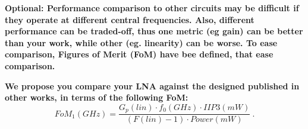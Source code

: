 






\begin{pexbox}{}
   \noindent \textbf{Optional: Performance comparison to other circuits may be difficult if they operate at different central frequencies. Also, different performance can be traded-off, thus one metric (eg gain) can be better than your work, while other (eg. linearity) can be worse. To ease comparison, Figures of Merit (FoM) have bee defined, that ease comparison.}

   \noindent \textbf{We propose you compare your LNA against the designed published in other works, in
   terms of the following FoM:}
   \begin{equation}
      FoM_1 (GHz) = \frac{G_p(lin) \cdot f_0 (GHz) \cdot IIP3 (mW) }{ \left(F(lin) - 1\right) \cdot Power (mW) } \ .
   \end{equation}
\end{pexbox}

